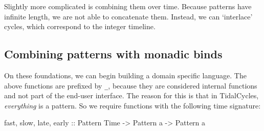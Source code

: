 \documentclass[
]{article}
\newenvironment{Shaded}{}{}
\newcommand{\DataTypeTok}[1]{\textcolor[rgb]{0.56,0.13,0.00}{#1}}
\newcommand{\FunctionTok}[1]{\textcolor[rgb]{0.02,0.16,0.49}{#1}}
\newcommand{\KeywordTok}[1]{\textcolor[rgb]{0.00,0.44,0.13}{\textbf{#1}}}
\newcommand{\NormalTok}[1]{#1}
\newcommand{\OperatorTok}[1]{\textcolor[rgb]{0.40,0.40,0.40}{#1}}
\newcommand{\OtherTok}[1]{\textcolor[rgb]{0.00,0.44,0.13}{#1}}
\begin{document}
Slightly more complicated is combining them over time. Because patterns
have infinite length, we are not able to concatenate them. Instead, we
can `interlace' cycles, which correspond to the integer timeline.

\begin{Shaded}
\end{Shaded}

\subsection{Combining patterns with monadic
binds}\label{combining-patterns-with-monadic-binds}

On these foundations, we can begin building a domain specific language.
The above functions are prefixed by \texttt{\_}, because they are
considered internal functions and not part of the end-user interface.
The reason for this is that in TidalCycles, \emph{everything} is a
pattern. So we require functions with the following time signature:

\begin{Shaded}
\begin{Highlighting}[]
\NormalTok{fast, slow, late,}\OtherTok{ early ::} \DataTypeTok{Pattern} \DataTypeTok{Time} \OtherTok{{-}\textgreater{}} \DataTypeTok{Pattern}\NormalTok{ a }\OtherTok{{-}\textgreater{}} \DataTypeTok{Pattern}\NormalTok{ a}
\end{Highlighting}
\end{Shaded}
\end{document}
